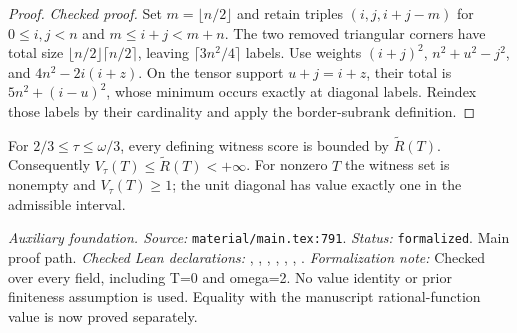 \begin{proof}
\leanok
{}
\textit{Checked proof.} Set $m=\lfloor n/2\rfloor$ and retain triples $(i,j,i+j-m)$ for $0\le i,j<n$ and $m\le i+j<m+n$. The two removed triangular corners have total size $\lfloor n/2\rfloor\lceil n/2\rceil$, leaving $\lceil3n^2/4\rceil$ labels. Use weights $(i+j)^2$, $n^2+u^2-j^2$, and $4n^2-2i(i+z)$. On the tensor support $u+j=i+z$, their total is $5n^2+(i-u)^2$, whose minimum occurs exactly at diagonal labels. Reindex those labels by their cardinality and apply the border-subrank definition.
\end{proof}

\renewcommand{\thetheorem}{A11}
\begin{lemma}
\label{aux:value-finiteness}
\leanok
{}
For $2/3\le\tau\le\omega/3$, every defining witness score is bounded by $\widetilde R(T)$. Consequently $V_\tau(T)\le\widetilde R(T)<+\infty$. For nonzero $T$ the witness set is nonempty and $V_\tau(T)\ge1$; the unit diagonal has value exactly one in the admissible interval.
\end{lemma}

\noindent\textit{Auxiliary foundation. Source:} \texttt{material/main.tex:791}.
\textit{Status:} \texttt{formalized}. Main proof path.
\textit{Checked Lean declarations:} , , , , , , .
\textit{Formalization note:} Checked over every field, including T=0 and omega=2. No value identity or prior finiteness assumption is used. Equality with the manuscript rational-function value is now proved separately.

